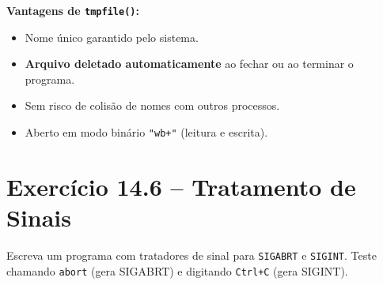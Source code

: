 \documentclass[12pt,a4paper]{article}
\begin{document}
\begin{respostabox}
\textbf{Vantagens de \texttt{tmpfile()}:}
\begin{itemize}[noitemsep]
  \item Nome único garantido pelo sistema.
  \item \textbf{Arquivo deletado automaticamente} ao fechar ou ao terminar o programa.
  \item Sem risco de colisão de nomes com outros processos.
  \item Aberto em modo binário \texttt{"wb+"} (leitura e escrita).
\end{itemize}
\end{respostabox}

\newpage

\section{Exercício 14.6 -- Tratamento de Sinais}

\begin{enunciadoBox}[Enunciado 14.6]
Escreva um programa com tratadores de sinal para \texttt{SIGABRT} e
\texttt{SIGINT}. Teste chamando \texttt{abort} (gera SIGABRT) e digitando
\texttt{Ctrl+C} (gera SIGINT).
\end{enunciadoBox}
\end{document}
